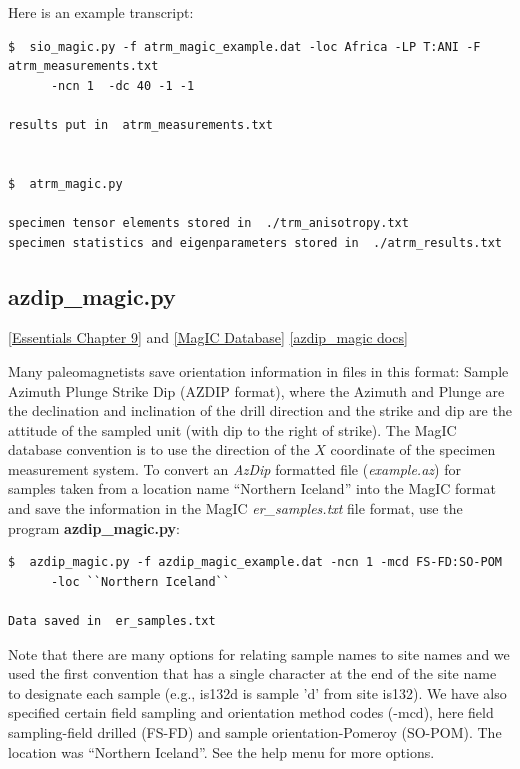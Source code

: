 \documentclass[11pt]{book}
\begin{document}
{{Here is an example transcript:

\begin{verbatim}
$  sio_magic.py -f atrm_magic_example.dat -loc Africa -LP T:ANI -F atrm_measurements.txt
      -ncn 1  -dc 40 -1 -1

results put in  atrm_measurements.txt


$  atrm_magic.py

specimen tensor elements stored in  ./trm_anisotropy.txt
specimen statistics and eigenparameters stored in  ./atrm_results.txt
\end{verbatim}


\subsection {azdip\_magic.py}
 \href{http://earthref.org/MAGIC/books/Tauxe/Essentials/WebBook3ch9.html#ch9}{[Essentials Chapter 9]} and \href{#MagICDatabase}{[MagIC Database]} 
 \href{https://github.com/PmagPy/PmagPy/blob/master/programs/azdip_magic.py}{[azdip\_magic docs]}

Many paleomagnetists save orientation information in files in this format:
Sample  Azimuth Plunge  Strike  Dip (AZDIP format),  where the Azimuth and Plunge are the declination and inclination of the drill direction and the strike and dip are the attitude of the sampled unit (with dip to the right of strike).   The MagIC database convention is to
use the direction of the $X$ coordinate of the specimen measurement system.  To convert an  {\it AzDip} formatted file ({\it example.az}) for samples taken from a location name ``Northern Iceland''  into the MagIC format and save the information in the MagIC {\it er\_samples.txt}  file format, use the program {\bf azdip\_magic.py}:

\begin{verbatim}
$  azdip_magic.py -f azdip_magic_example.dat -ncn 1 -mcd FS-FD:SO-POM
      -loc ``Northern Iceland``

Data saved in  er_samples.txt
\end{verbatim}

Note that there are many options for relating sample names to site names and we used the first convention that has a single character at the end of the site name to designate each sample (e.g., is132d is sample 'd' from site is132).   We have also specified certain field sampling and orientation method codes (-mcd), here field sampling-field drilled (FS-FD) and sample orientation-Pomeroy (SO-POM).  The location was ``Northern Iceland''.   See the help menu for more options.

}}
\end{document}
